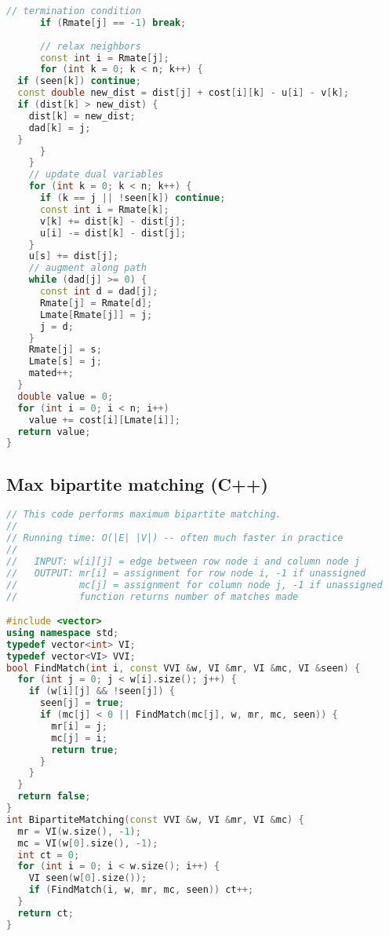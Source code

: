 \begin{lstlisting}[language=C++]
      // termination condition
      if (Rmate[j] == -1) break;
      
      // relax neighbors
      const int i = Rmate[j];
      for (int k = 0; k < n; k++) {
  if (seen[k]) continue;
  const double new_dist = dist[j] + cost[i][k] - u[i] - v[k];
  if (dist[k] > new_dist) {
    dist[k] = new_dist;
    dad[k] = j;
  }
      }
    }
    // update dual variables
    for (int k = 0; k < n; k++) {
      if (k == j || !seen[k]) continue;
      const int i = Rmate[k];
      v[k] += dist[k] - dist[j];
      u[i] -= dist[k] - dist[j];
    }
    u[s] += dist[j];
    // augment along path
    while (dad[j] >= 0) {
      const int d = dad[j];
      Rmate[j] = Rmate[d];
      Lmate[Rmate[j]] = j;
      j = d;
    }
    Rmate[j] = s;
    Lmate[s] = j;
    mated++;
  }
  double value = 0;
  for (int i = 0; i < n; i++)
    value += cost[i][Lmate[i]];
  return value;
}
\end{lstlisting}
\subsection{Max bipartite matching (C++)}
\begin{lstlisting}[language=C++]
// This code performs maximum bipartite matching.
//
// Running time: O(|E| |V|) -- often much faster in practice
//
//   INPUT: w[i][j] = edge between row node i and column node j
//   OUTPUT: mr[i] = assignment for row node i, -1 if unassigned
//           mc[j] = assignment for column node j, -1 if unassigned
//           function returns number of matches made

#include <vector>
using namespace std;
typedef vector<int> VI;
typedef vector<VI> VVI;
bool FindMatch(int i, const VVI &w, VI &mr, VI &mc, VI &seen) {
  for (int j = 0; j < w[i].size(); j++) {
    if (w[i][j] && !seen[j]) {
      seen[j] = true;
      if (mc[j] < 0 || FindMatch(mc[j], w, mr, mc, seen)) {
        mr[i] = j;
        mc[j] = i;
        return true;
      }
    }
  }
  return false;
}
int BipartiteMatching(const VVI &w, VI &mr, VI &mc) {
  mr = VI(w.size(), -1);
  mc = VI(w[0].size(), -1);
  int ct = 0;
  for (int i = 0; i < w.size(); i++) {
    VI seen(w[0].size());
    if (FindMatch(i, w, mr, mc, seen)) ct++;
  }
  return ct;
}
\end{lstlisting}
